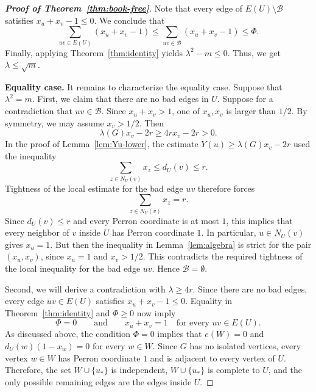 \documentclass[11pt,a4paper]{article}
\theoremstyle{definition}
\theoremstyle{plain}
\renewcommand{\le}{\leqslant}
\renewcommand{\ge}{\geqslant}
\begin{document}
\begin{proof}[{\bf Proof of Theorem~\ref{thm:book-free}}]
Note that every edge of $E(U)\setminus\mathcal{B}$ satisfies $x_u+x_v-1\le 0$. We conclude that 
\[
\sum_{uv\in E(U)}(x_u+x_v-1)
\le
\sum_{uv\in \mathcal{B}}(x_u+x_v-1)
\le \Phi.
\]
Finally, applying Theorem~\ref{thm:identity} yields 
$
\lambda^2-m 
\le 0$. 
Thus, we get $\lambda \le \sqrt{m}$. 


\smallskip 
\noindent 
{\bf Equality case.}
It remains to characterize the equality case. Suppose that $\lambda^2=m$. First, 
we claim that there are no bad edges in $U$. Suppose for a contradiction that $uv\in\mathcal B$. Since $x_u+ x_v>1$, one of $x_u,x_v$ is larger than $1/2$. By symmetry, we may assume $x_v>1/2$. Then
\[
\lambda(G)x_v-2r\ge 4rx_v-2r>0.
\]
In the proof of Lemma~\ref{lem:Yu-lower}, the estimate
$Y(u)\ge \lambda(G)x_v-2r$ 
used the inequality
\[
\sum_{z\in N_U(v)}x_z\le d_U(v)\le r.
\]
Tightness of the local estimate for the bad edge $uv$ therefore forces
\[
\sum_{z\in N_U(v)}x_z=r.
\]
Since $d_U(v)\le r$ and every Perron coordinate is at most $1$, this implies that every neighbor of $v$ inside $U$ has Perron coordinate $1$. In particular, $u\in N_U(v)$ gives $x_u=1$. 
But then the inequality in Lemma~\ref{lem:algebra} is strict for the pair $(x_u,x_v)$, since $x_u=1$ and $x_v>1/2$. 
This contradicts the required tightness of the local inequality for the bad edge $uv$. Hence
$\mathcal B= \emptyset$. 

Second, we will derive a contradiction with $\lambda \ge 4r$. 
Since there are no bad edges, every edge $uv\in E(U)$ satisfies $x_u+x_v-1\le 0$. Equality in Theorem~\ref{thm:identity} and $\Phi\ge 0$ now imply
\[
\Phi=0
\qquad\text{and}\qquad
x_u+x_v=1\quad\text{for every }uv\in E(U).
\]
As discussed above, the condition $\Phi=0$ implies that $e(W)=0$ and $d_U(w)(1-x_w)=0$ for every $w\in W$. 
Since $G$ has no isolated vertices, every vertex $w\in W$ has Perron coordinate $1$ and is adjacent to every vertex of $U$. Therefore, 
the set $W\cup\{u_*\}$ is independent, $W\cup\{u_*\}$ is complete to $U$, and the only possible remaining edges are the edges inside $U$.


\end{proof}
\end{document}

